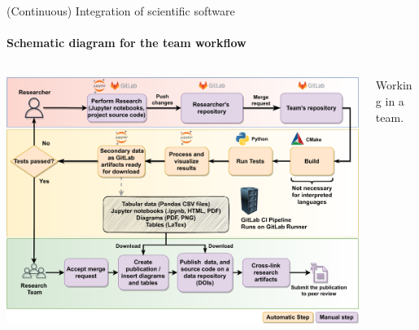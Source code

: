 \begin{frame}{(Continuous) Integration of scientific software} 
	\framesubtitle{Schematic diagram for the team workflow}
        \vfill

        \centering

        \begin{columns}
            \begin{column}[c]{0.55\textwidth}
                \includegraphics[width=\columnwidth]{figures/ZINF-CI-diagram.pdf}
            \end{column}
            \begin{column}[c]{0.20\textwidth}
                Working in a team.
            \end{column}
        \end{columns}
\end{frame}

